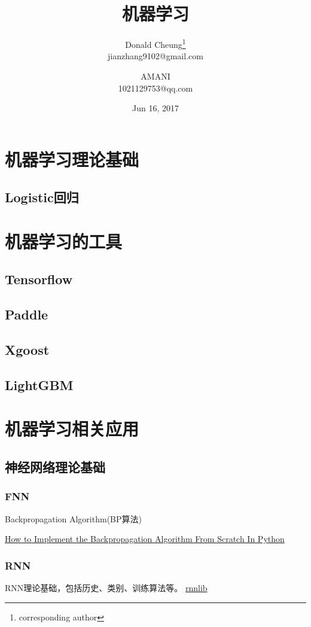 \documentclass[UTF8,10pt,a4paper]{ctexbook}
\title{机器学习}
\author{Donald Cheung\thanks{corresponding author}\\jianzhang9102@gmail.com \and
        AMANI\\1021129753@qq.com}
\date{Jun 16, 2017} %
\begin{document}
\tableofcontents

\part{机器学习理论基础}

\chapter{Logistic回归}


\part{机器学习的工具}
\chapter{Tensorflow}
\chapter{Paddle}
\chapter{Xgoost}
\chapter{LightGBM}

\part{机器学习相关应用}

\chapter{神经网络理论基础}
\section{FNN}

Backpropagation Algorithm(BP算法)

\href{https://machinelearningmastery.com/implement-backpropagation-algorithm-scratch-python/}{How to Implement the Backpropagation Algorithm From Scratch In Python}


\section{RNN}
RNN理论基础，包括历史、类别、训练算法等。
\href{https://github.com/szcom/rnnlib}{rnnlib}
\end{document}
